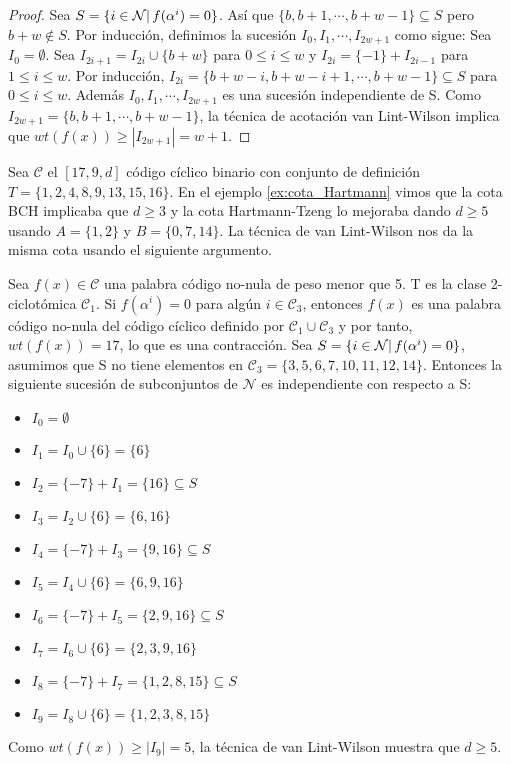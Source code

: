 \begin{proof}
Sea $S = \{ i \in \mathcal{N} | \thinspace f(\alpha^i) = 0 \}$. Así que $\{ b,b+1, \cdots , b+w-1 \} \subseteq S$ pero $b+w \not\in S$. Por inducción, definimos la sucesión $I_0,I_1, \cdots , I_{2w+1}$ como sigue: Sea $I_0 = \emptyset$. Sea $I_{2i+1} = I_{2i} \cup \{ b+w \}$ para $ 0 \leq i \leq w$ y $I_{2i} = \{ -1 \} + I_{2i-1}$ para $ 1 \leq i \leq w$. Por inducción, $I_{2i} = \{ b+w-i,b+w-i+1, \cdots , b+w-1 \} \subseteq S$ para $ 0 \leq i \leq w$. Además $I_0,I_1, \cdots , I_{2w+1}$ es una sucesión independiente de S. Como $I_{2w+1} = \{ b,b+1, \cdots , b+w-1 \}$, la técnica de acotación van Lint-Wilson implica que $wt(f(x)) \geq |I_{2w+1} | = w+1$.
\end{proof}

\begin{exampleth}
Sea $\mathcal{C}$ el $[17,9,d]$ código cíclico binario con conjunto de definición $T = \{ 1,2,4,8,9,13,15,16 \}$. En el ejemplo \ref{ex:cota_Hartmann} vimos que la cota BCH implicaba que $ d \geq 3$ y la cota Hartmann-Tzeng lo mejoraba dando $d \geq 5$ usando $A = \{ 1,2 \}$ y $B = \{ 0,7,14 \}$. La técnica de van Lint-Wilson nos da la misma cota usando el siguiente argumento. 

Sea $f(x) \in \mathcal{C}$ una palabra código no-nula de peso menor que 5. T es la clase 2-ciclotómica $\mathcal{C}_1$. Si $f(\alpha^i) = 0$ para algún $ i \in \mathcal{C}_3$, entonces $f(x)$ es una palabra código no-nula del código cíclico definido por $\mathcal{C}_1 \cup \mathcal{C}_3$ y por tanto, $wt(f(x)) = 17$, lo que es una contracción. Sea $S = \{ i \in \mathcal{N} | \thinspace f(\alpha^i) = 0 \}$, asumimos que S no tiene elementos en $\mathcal{C}_3 = \{ 3,5,6,7,10,11,12,14 \}$. Entonces la siguiente sucesión de subconjuntos de $\mathcal{N}$ es independiente con respecto a S:

\begin{itemize}
	\item $I_0 = \emptyset$
	\item $I_1 = I_0 \cup \{ 6 \} = \{ 6 \}$
	\item $I_2 = \{ -7 \} + I_1  = \{ 16 \} \subseteq S$
	\item $I_3 = I_2 \cup \{ 6 \} = \{ 6,16 \}$
	\item $I_4 = \{ -7 \} + I_3  = \{ 9, 16 \} \subseteq S$
	\item $I_5 = I_4 \cup \{ 6 \} = \{ 6,9,16 \}$
	\item $I_6 = \{ -7 \} + I_5  = \{ 2,9,16 \} \subseteq S$
	\item $I_7 = I_6 \cup \{ 6 \} = \{ 2,3,9,16 \}$
	\item $I_8 = \{ -7 \} + I_7  = \{ 1,2,8,15 \} \subseteq S$
	\item $I_9 = I_8 \cup \{ 6 \} = \{ 1,2,3,8,15 \}$
\end{itemize}

Como $wt(f(x)) \geq | I_9 | = 5$, la técnica de van Lint-Wilson muestra que $ d \geq 5$.

\end{exampleth}

